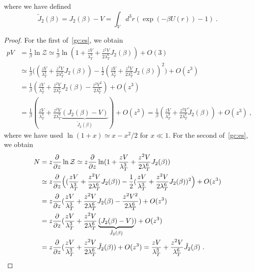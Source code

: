     where we have defined 
    \begin{equation*}
        \tilde J_2 (\beta) = J_2 (\beta) - V = \int_V d^3 r (\exp(- \beta U(r)) - 1) ~.
    \end{equation*}
    \begin{proof}
        For the first of~\eqref{gc:es}, we obtain 
        \begin{equation*}
        \begin{aligned}
            p V & = \frac{1}{\beta} \ln \mathcal Z \simeq \frac{1}{\beta} \ln (1 + \frac{z V}{\lambda_T^3} + \frac{z^2 V}{2 \lambda_T^6} J_2 (\beta)) + O(3) \\ & \simeq \frac{1}{\beta} \Big ( (\frac{z V}{\lambda_T^3} + \frac{z^2 V}{2 \lambda_T^6} J_2 (\beta)) - \frac{1}{2} (\frac{z V}{\lambda_T^3} + \frac{z^2 V}{2 \lambda_T^6} J_2 (\beta))^2 \Big) + O(z^3) \\ & = \frac{1}{\beta} (\frac{z V}{\lambda_T^3} + \frac{z^2 V}{2 \lambda_T^6} J_2 (\beta) - \frac{z^2 V^2}{2 \lambda_T^6}) + O(z^3) \\ & = \frac{1}{\beta} (\frac{z V}{\lambda_T^3} + \frac{z^2 V}{2 \lambda_T^6} \underbrace{(J_2 (\beta) - V)}_{\tilde J_2 (\beta)}) + O(z^3) = \frac{1}{\beta} (\frac{zV}{\lambda_T^3} + \frac{z^2V}{2 \lambda_T^6} \tilde J_2 (\beta)) + O(z^3) ~,
        \end{aligned}
        \end{equation*}
        where we have used $\ln (1 + x) \simeq x - x^2/2$ for $x \ll 1$.
        For the second of~\eqref{gc:es}, we obtain 
        \begin{equation*}
        \begin{aligned}
            N & = z \frac{\partial}{\partial z} \ln \mathcal Z \simeq z \frac{\partial}{\partial z} \ln (1 + \frac{z V}{\lambda_T^3} + \frac{z^2 V}{2 \lambda_T^6} J_2 (\beta)) \\ & \simeq z \frac{\partial}{\partial z} \Big ( (\frac{z V}{\lambda_T^3} + \frac{z^2 V}{2 \lambda_T^6} J_2 (\beta)) - \frac{1}{2} (\frac{z V}{\lambda_T^3} + \frac{z^2 V}{2 \lambda_T^6} J_2 (\beta))^2 \Big) + O(z^3) \\ & = z \frac{\partial}{\partial z} (\frac{z V}{\lambda_T^3} + \frac{z^2 V}{2 \lambda_T^6} J_2 (\beta) - \frac{z^2 V^2}{2 \lambda_T^6}) + O(z^3)
            \\ & = z \frac{\partial}{\partial z} (\frac{z V}{\lambda_T^3} + \frac{z^2 V}{2 \lambda_T^6} \underbrace{(J_2 (\beta) - V)}_{\tilde J_2 (\beta)}) + O(z^3) \\ & = z \frac{\partial}{\partial z} (\frac{zV}{\lambda_T^3} + \frac{z^2V}{2 \lambda_T^6} \tilde J_2 (\beta)) + O(z^3)  = \frac{z V}{\lambda_T^3} + \frac{z^2 V }{\lambda_T^6} \tilde J_2 (\beta) ~.
        \end{aligned}
        \end{equation*}
    \end{proof}
